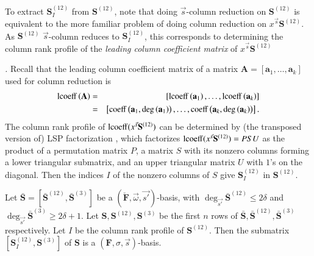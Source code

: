 To extract $\mathbf{S}_{I}^{\left(12\right)}$ from $\mathbf{S}^{\left(12\right)}$,
note that doing $\vec{s}$-column reduction on $\mathbf{S}^{\left(12\right)}$
is equivalent to the more familiar problem of doing column reduction
on $x^{\vec{s}}\mathbf{S}^{\left(12\right)}$. As $\mathbf{S}^{\left(12\right)}$
$\vec{s}$-column reduces to \textbf{$\mathbf{S}_{I}^{\left(12\right)}$},
this corresponds to determining the column rank profile of the\emph{
leading column coefficient matrix }of\emph{ }\textbf{$x^{\vec{s}}\mathbf{S}^{\left(12\right)}$}%
\begin{comment}
\emph{ }$S^{\left(12\right)}=\lcoeff(x^{\vec{s}}\cdot\mathbf{S}^{\left(12\right)})$ 
\end{comment}
{}\emph{. }Recall that the leading column coefficient matrix of a matrix
$\mathbf{A}=\left[\mathbf{a}_{1},\dots,\mathbf{a}_{k}\right]$ used
for column reduction is\emph{ \begin{eqnarray*}
\operatorname{lcoeff}\left(\mathbf{A}\right) & = & \left[\operatorname{lcoeff}\left(\mathbf{a}_{1}\right),\dots,\operatorname{lcoeff}\left(\mathbf{a}_{k}\right)\right]\\
 & = & \left[\operatorname{coeff}\left(\mathbf{a}_{1},\deg\left(\mathbf{a}_{1}\right)\right),\dots,\operatorname{coeff}\left(\mathbf{a}_{k},\deg\left(\mathbf{a}_{k}\right)\right)\right].\end{eqnarray*}
 }The column rank profile of $\operatorname{lcoeff}(x^{\vec{s}}\mathbf{S}^{\left(12\right)})$
can be determined by (the transposed version of) LSP factorization
\citep{IbarraMH82}, which factorizes $\operatorname{lcoeff}(x^{\vec{s}}\mathbf{S}^{\left(12\right)})=PSU$
as the product of a permutation matrix $P$, a matrix $S$ with its
nonzero columns forming a lower triangular submatrix, and an upper
triangular matrix $U$ with $1$'s on the diagonal. Then the indices
$I$ of the nonzero columns of $S$ give $\mathbf{S}_{I}^{\left(12\right)}$
in $\mathbf{S}^{\left(12\right)}$. 
\begin{thm}
\label{thm:mainTheorem}Let $\bar{\mathbf{S}}=[\bar{\mathbf{S}}^{\left(12\right)},\bar{\mathbf{S}}^{\left(3\right)}]$
be a $(\check{\mathbf{F}},\vec{\omega},\vec{s'})$-basis, with $\deg_{\vec{s'}}\bar{\mathbf{S}}^{\left(12\right)}\le2\delta$
and $\deg_{\vec{s'}}\bar{\mathbf{S}}^{\left(3\right)}\ge2\delta+1$.
Let $\mathbf{S},\mathbf{S}^{\left(12\right)},\mathbf{S}^{\left(3\right)}$
be the first $n$ rows of $\bar{\mathbf{S}},\bar{\mathbf{S}}^{\left(12\right)},\bar{\mathbf{S}}^{\left(3\right)}$
respectively. Let $I$ be the column rank profile of $\mathbf{S}^{\left(12\right)}$.
Then the submatrix\textbf{ $[\mathbf{S}_{I}^{\left(12\right)},\mathbf{S}^{\left(3\right)}]$
}of $\mathbf{S}$ is a $\left(\mathbf{F},\sigma,\vec{s}\right)$-basis. \end{thm}
